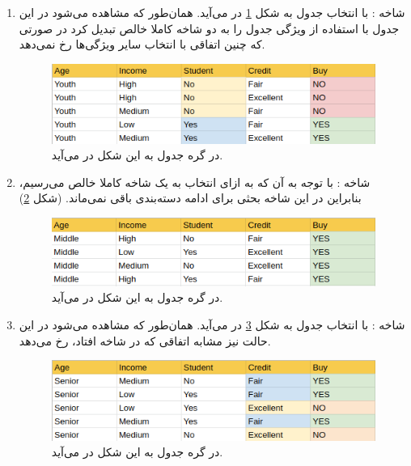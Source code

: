 \documentclass{article}
\begin{document}
\begin{enumerate}
    \item شاخه‌ : با انتخاب  جدول به شکل \ref{youth-branch} در می‌آید. همان‌طور که مشاهده
    می‌شود در این جدول با استفاده از ویژگی  جدول را به دو شاخه کاملا خالص تبدیل کرد در صورتی که
    چنین اتفاقی با انتخاب سایر ویژگی‌ها رخ نمی‌دهد.
    \begin{figure}[h]
        \centering
        \includegraphics[scale=0.5]{images/q4/youth.png}
        \caption{در گره  جدول به این شکل در می‌آید.}
        \label{youth-branch}
    \end{figure}
    \item شاخه‌ : با توجه به آن که به ازای انتخاب  به یک شاخه کاملا خالص می‌رسیم،
    بنابراین در این شاخه بحثی برای ادامه دسته‌بندی باقی نمی‌ماند. (شکل \ref{middle-branch})
    \begin{figure}[h]
        \centering
        \includegraphics[scale=0.5]{images/q4/middle.png}
        \caption{در گره  جدول به این شکل در می‌آید.}
        \label{middle-branch}
    \end{figure}
    \item شاخه‌ : با انتخاب  جدول به شکل \ref{senior-branch} در می‌آید. همان‌طور که مشاهده
    می‌شود در این حالت نیز مشابه اتفاقی که در شاخه  افتاد، رخ می‌دهد.
    \begin{figure}[h]
        \centering
        \includegraphics[scale=0.5]{images/q4/senior.png}
        \caption{در گره  جدول به این شکل در می‌آید.}
        \label{senior-branch}
    \end{figure}
\end{enumerate}
\end{document}
